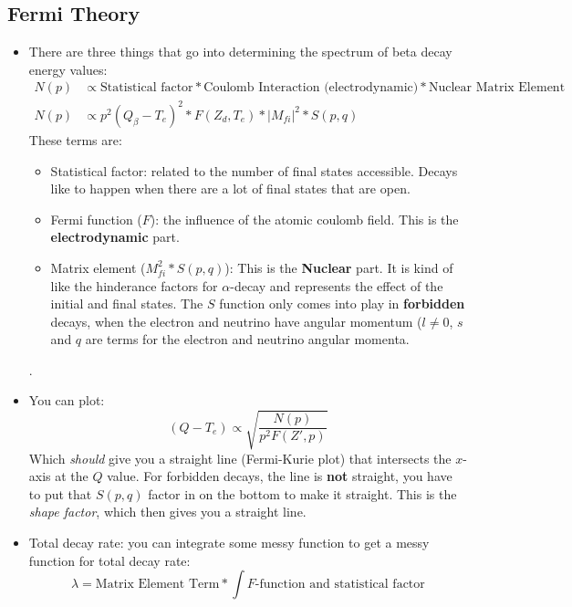 \documentclass[letter]{article}
\begin{document}
\subsection{Fermi Theory}
\begin{itemize}
\item There are three things that go into
  determining the spectrum of beta decay energy values:
  \begin{equation*}
    \begin{split}
    N(p) &\propto \text{Statistical factor} * \text{Coulomb Interaction
    (electrodynamic)} * \text{Nuclear Matrix Element} \\
  N(p) &\propto p^2(Q_\beta-T_e)^2*F(Z_d,T_e)*|M_{fi}|^2*S(p,q)
\end{split}
\end{equation*}
These terms are:
\begin{itemize}
\item Statistical factor: related to the number of final states
  accessible. Decays like to happen when there are a lot of final
  states that are open.
\item Fermi function ($F$): the influence of the atomic coulomb
  field. This is the \textbf{electrodynamic} part.
\item Matrix element ($M_{fi}^2*S(p,q)$): This is the \textbf{Nuclear}
  part. It is kind of like the hinderance factors for $\alpha$-decay
  and represents the effect of the initial and final states. The $S$
  function only comes into play in \textbf{forbidden} decays, when the
  electron and neutrino have angular momentum ($l \neq 0$, $s$ and $q$
  are terms for the electron and neutrino angular momenta.
\end{itemize}
\cite[pp.281-282]{krane}.
\item You can plot:
  \begin{equation*}
    (Q-T_e) \propto \sqrt{\frac{N(p)}{p^2F(Z',p)}}
  \end{equation*}
Which \textit{should} give you a straight line (Fermi-Kurie plot) that intersects the
$x$-axis at the $Q$ value. For forbidden decays, the line is
\textbf{not} straight, you have to put that $S(p,q)$ factor in on the
bottom to make it straight. This is the \textit{shape factor}, which
then gives you a straight line.~\cite[pp. 282]{krane}
\item Total decay rate: you can integrate some messy function to get a
  messy function for total decay rate:
  \begin{equation*}
    \lambda = \text{Matrix Element Term} * \int\text{$F$-function and statistical factor}

\end{equation*}
\end{itemize}
\end{document}
